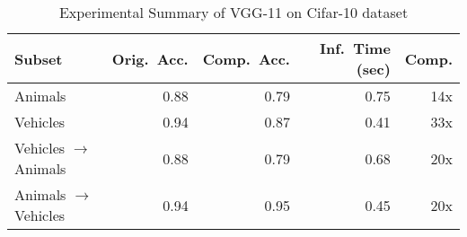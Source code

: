\documentclass[../main]{subfiles}
\begin{document}
    
    \begin{table}[t]
        \centering
        \caption{Experimental Summary of VGG-11 on Cifar-10 dataset}
        \begin{tabular}{l r r r r}
        	\toprule
            Subset					& Orig.~Acc.	& Comp.~Acc.	& Inf.~Time (sec)	& Comp.	\\
            \midrule
            Animals					& 0.88			& 0.79			& 0.75				& 14x	\\
            Vehicles				& 0.94			& 0.87			& 0.41				& 33x	\\
            Vehicles $\to$ Animals	& 0.88			& 0.79			& 0.68				& 20x	\\
            Animals $\to$ Vehicles	& 0.94			& 0.95			& 0.45				& 20x	\\
            \bottomrule
        \end{tabular}
        \label{tab:VGG11-CIFAR10_subset+transfer}
    \end{table}
\end{document}
